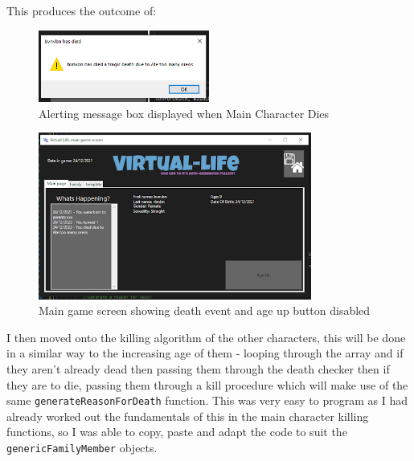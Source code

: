 This produces the outcome of:
\begin{figure}[H]
    \centering
    \includegraphics[width=0.5\textwidth]{images/implementation/deathProof1.png}
    \caption{Alerting message box displayed when Main Character Dies}
    \label{fig:implementation-deathProof1}
\end{figure}
\begin{figure}[H]
    \centering
    \includegraphics[width=0.8\textwidth]{images/implementation/deathProof2.png}
    \caption{Main game screen showing death event and age up button disabled}
    \label{fig:implementation-deathProof2}
\end{figure}
\noindent I then moved onto the killing algorithm of the other characters, this will be done in a similar way to the increasing age of them - looping through the array and if they aren't already dead then passing them through the death checker then if they are to die, passing them through a kill procedure which will make use of the same \verb|generateReasonForDeath| function.
This was very easy to program as I had already worked out the fundamentals of this in the main character killing functions, so I was able to copy, paste and adapt the code to suit the \verb|genericFamilyMember| objects.

